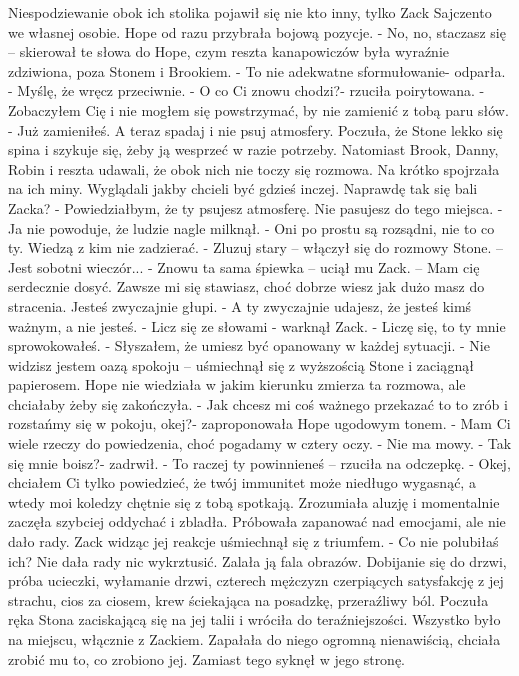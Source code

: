\documentclass[12pt,a4paper]{book}
\begin{document}
Niespodziewanie obok ich stolika pojawił się nie kto inny, tylko Zack Sajczento we własnej osobie. Hope od razu przybrała bojową pozycje.
- No, no, staczasz się – skierował te słowa do Hope, czym reszta kanapowiczów była wyraźnie zdziwiona, poza Stonem i Brookiem. 
- To nie adekwatne sformułowanie- odparła. 
- Myślę, że wręcz przeciwnie. 
- O co Ci znowu chodzi?- rzuciła poirytowana. 
- Zobaczyłem Cię i nie mogłem się powstrzymać, by nie zamienić z tobą paru słów.
- Już zamieniłeś. A teraz spadaj i nie psuj atmosfery. 
Poczuła, że Stone lekko się spina i szykuje się, żeby ją wesprzeć w razie potrzeby. Natomiast Brook, Danny, Robin i reszta udawali, że obok nich nie toczy się rozmowa. Na krótko spojrzała na ich miny. Wyglądali jakby chcieli być gdzieś inczej. Naprawdę tak się bali Zacka?
- Powiedziałbym, że ty psujesz atmosferę. Nie pasujesz do tego miejsca. 
- Ja nie powoduje, że ludzie nagle milknął. 
- Oni po prostu są rozsądni, nie to co ty. Wiedzą z kim nie zadzierać. 
- Zluzuj stary – włączył się do rozmowy Stone. – Jest sobotni wieczór...
- Znowu ta sama śpiewka – uciął mu Zack. – Mam cię serdecznie dosyć. Zawsze mi się stawiasz, choć dobrze wiesz jak dużo masz do stracenia. Jesteś zwyczajnie głupi. 
- A ty zwyczajnie udajesz, że jesteś kimś ważnym, a nie jesteś. 
- Licz się ze słowami - warknął Zack.
- Liczę się, to ty mnie sprowokowałeś. 
- Słyszałem, że umiesz być opanowany w każdej sytuacji. 
- Nie widzisz jestem oazą spokoju –  uśmiechnął się z wyższością Stone i zaciągnął papierosem. 
Hope nie wiedziała w jakim kierunku zmierza ta rozmowa, ale chciałaby żeby się zakończyła. 
- Jak chcesz mi coś ważnego przekazać to to zrób i rozstańmy się w pokoju, okej?- zaproponowała Hope ugodowym tonem. 
- Mam Ci wiele rzeczy do powiedzenia, choć pogadamy w cztery oczy. 
- Nie ma mowy.
- Tak się mnie boisz?- zadrwił.
- To raczej ty powinnieneś – rzuciła na odczepkę. 
- Okej, chciałem Ci tylko powiedzieć, że twój immunitet może niedługo wygasnąć, a wtedy moi koledzy chętnie się z tobą spotkają. 
Zrozumiała aluzję i momentalnie  zaczęła szybciej oddychać i zbladła. Próbowała zapanować nad emocjami, ale nie dało rady. Zack widząc jej reakcje uśmiechnął się z triumfem. 
- Co nie polubiłaś ich? 
Nie dała rady nic wykrztusić. Zalała ją fala obrazów. Dobijanie się do drzwi, próba ucieczki, wyłamanie drzwi, czterech mężczyzn czerpiących satysfakcję z jej strachu, cios za ciosem, krew ściekająca na posadzkę, przeraźliwy ból. 
Poczuła ręka Stona zaciskającą się na jej talii i wróciła do teraźniejszości. Wszystko było na miejscu, włącznie z Zackiem. Zapałała do niego ogromną nienawiścią, chciała zrobić mu to, co zrobiono jej. Zamiast tego syknęł w jego stronę. 
\end{document}
